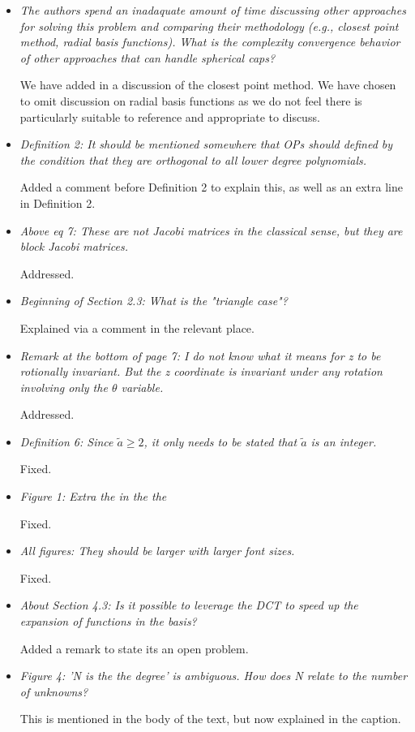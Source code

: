 \documentclass[10pt]{letter}
\newcommand{\comment}[1]{\textit{\color{bluey}#1}}
\begin{document}
\begin{itemize}[parsep=1em,leftmargin=1em]

\item \comment{The authors spend an inadaquate amount of time discussing other approaches for solving this problem and comparing their methodology (e.g., closest point method, radial basis functions). What is the complexity convergence behavior of other approaches that can handle spherical caps?}

We have added in a discussion of the closest point method. We have chosen to omit discussion on radial basis functions as we do not feel there is particularly suitable to reference and appropriate to discuss.


\item \comment{Definition 2: It should be mentioned somewhere that OPs should defined by the condition that they are orthogonal to all lower degree polynomials.}

Added a comment before Definition 2 to explain this, as well as an extra line in Definition 2.


\item \comment{Above eq 7: These are not Jacobi matrices in the classical sense, but they are block Jacobi matrices.}

Addressed.


\item \comment{Beginning of Section 2.3: What is the "triangle case"?}

Explained via a comment in the relevant place.


\item \comment{Remark at the bottom of page 7: I do not know what it means for z to be rotionally invariant. But the z coordinate is invariant under any rotation involving only the $\theta$ variable.}

Addressed.


\item \comment{Definition 6: Since $\tilde a \ge 2$, it only needs to be stated that $\tilde a$ is an integer.}

Fixed.


\item \comment{Figure 1: Extra the in the the}

Fixed.


\item \comment{All figures: They should be larger with larger font sizes.}

Fixed.


\item \comment{About Section 4.3: Is it possible to leverage the DCT to speed up the expansion of functions in the basis?}

Added a remark to state its an open problem.


\item \comment{Figure 4: 'N is the the degree' is ambiguous. How does N relate to the number of unknowns?}

This is mentioned in the body of the text, but now explained in the caption.


\end{itemize}
\end{document}
